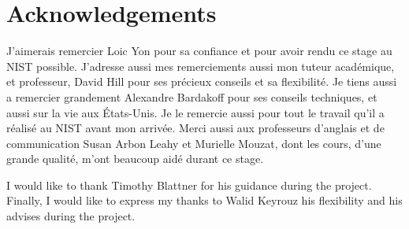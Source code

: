 
\pagestyle{empty}
\section*{Acknowledgements}
\doublespacing

J'aimerais remercier Loic Yon pour sa confiance et pour avoir rendu ce stage au
NIST possible. J'adresse aussi mes remerciements aussi mon tuteur académique, et
professeur, David Hill pour ses précieux conseils et sa flexibilité. Je tiens
aussi a remercier grandement Alexandre Bardakoff pour ses conseils techniques,
et aussi sur la vie aux États-Unis. Je le remercie aussi pour tout le travail
qu'il a réalisé au NIST avant mon arrivée. Merci aussi aux professeurs d'anglais
et de communication Susan Arbon Leahy et Murielle Mouzat, dont les cours, d'une
grande qualité, m'ont beaucoup aidé durant ce stage.

I would like to thank Timothy Blattner for his guidance during the project.
Finally, I would like to express my thanks to Walid Keyrouz his flexibility and
his advises during the project.

\singlespacing
